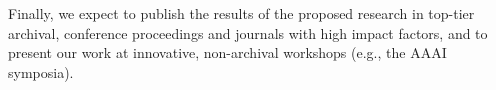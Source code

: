 
Finally, we expect to publish the results of the proposed research in
top-tier archival, conference proceedings and journals with high
impact factors, and to present our work at innovative, non-archival
workshops (e.g., the AAAI symposia).

